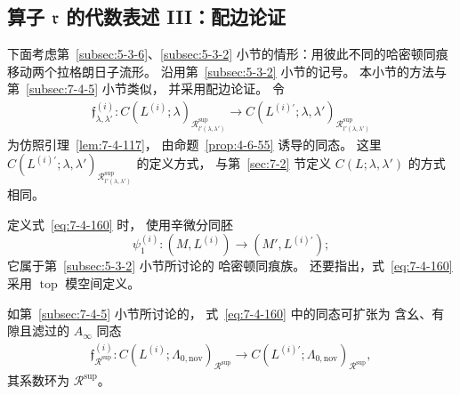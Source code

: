 
\subsection{算子 $\mathfrak r$ 的代数表述 III：配边论证}
\label{subsec:7-4-9}

下面考虑第~\ref{subsec:5-3-6}、\ref{subsec:5-3-2}
小节的情形：用彼此不同的哈密顿同痕
移动两个拉格朗日子流形。
沿用第~\ref{subsec:5-3-2} 小节的记号。
本小节的方法与第~\ref{subsec:7-4-5} 小节类似，
并采用配边论证。
令
\begin{equation}
\begin{aligned}
\mathfrak f^{(i)}_{\lambda,\lambda'}\colon
C(L^{(i)};\lambda)_
{\mathcal R^{\mathrm{sup}}_{l'(\lambda,\lambda')}}
\longrightarrow
C(L^{(i)\prime};\lambda,\lambda')_
{\mathcal R^{\mathrm{sup}}_{l'(\lambda,\lambda')}}
\end{aligned}
\tag{7.4.160}\label{eq:7-4-160}
\end{equation}
为仿照引理~\ref{lem:7-4-117}，
由命题~\ref{prop:4-6-55} 诱导的同态。
这里
$C(L^{(i)\prime};\lambda,\lambda')_
{\mathcal R^{\mathrm{sup}}_{l'(\lambda,\lambda')}}$
的定义方式，
与第~\ref{sec:7-2} 节定义
$C(L;\lambda,\lambda')$ 的方式相同。

定义式~\eqref{eq:7-4-160} 时，
使用辛微分同胚
\[
\psi^{(i)}_1\colon
(M,L^{(i)})\longrightarrow(M',L^{(i)\prime});
\]
它属于第~\ref{subsec:5-3-2} 小节所讨论的
哈密顿同痕族。
还要指出，式~\eqref{eq:7-4-160}
采用 $\operatorname{top}$ 模空间定义。

如第~\ref{subsec:7-4-5} 小节所讨论的，
式~\eqref{eq:7-4-160} 中的同态可扩张为
含幺、有隙且滤过的 $A_\infty$ 同态
\begin{equation}
\begin{aligned}
\mathfrak f^{(i)}_{\mathcal R^{\mathrm{sup}}}\colon
C(L^{(i)};\Lambda_{0,\mathrm{nov}})_
{\mathcal R^{\mathrm{sup}}}
\longrightarrow
C(L^{(i)\prime};\Lambda_{0,\mathrm{nov}})_
{\mathcal R^{\mathrm{sup}}},
\end{aligned}
\tag{7.4.161}\label{eq:7-4-161}
\end{equation}
其系数环为 $\mathcal R^{\mathrm{sup}}$。

